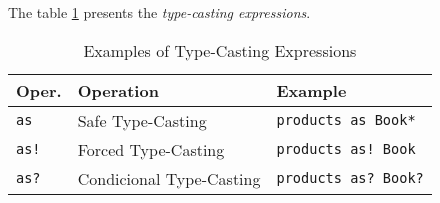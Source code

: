 The table \ref{tab:type-casting-examples} presents the \emph{type-casting expressions}.

\begin{table}[htbp]
\centering
\begin{tabular}
{ l l l }
\hline
Oper. & Operation & Example \\
\hline
\verb|as| & Safe Type-Casting & \verb|products as Book*| \\
\verb|as!| & Forced Type-Casting & \verb|products as! Book| \\
\verb|as?| & Condicional Type-Casting & \verb|products as? Book?|
\end{tabular}
\caption{Examples of Type-Casting Expressions}
\label{tab:type-casting-examples}
\end{table}
